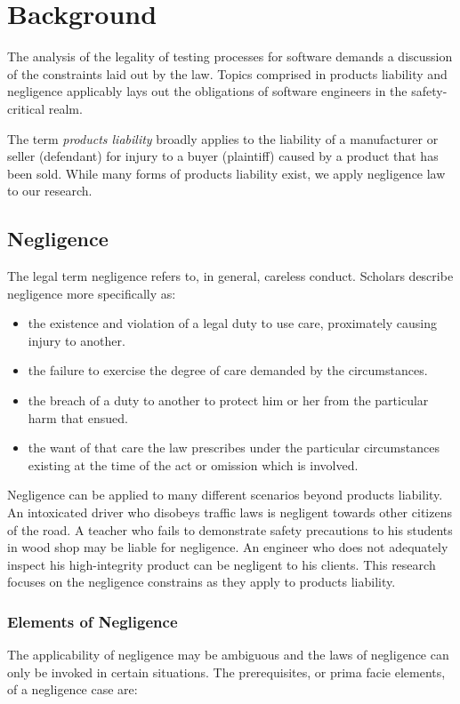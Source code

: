 \chapter{Background}
The analysis of the legality of testing processes for software demands a
discussion of the constraints laid out by the law. Topics comprised in products
liability and negligence applicably lays out the obligations of software
engineers in the safety-critical realm.

The term \textit{products liability} broadly applies to the liability of a
manufacturer or seller (defendant) for injury to a buyer (plaintiff) caused by
a product that has been sold. While many forms of products liability exist, we
apply negligence law to our research.

\section{Negligence}
The legal term negligence refers to, in general, careless conduct. Scholars
describe negligence more specifically as:

\singlespace
\begin{itemize}
 \item the existence and violation of a legal duty to use care, proximately 
 causing injury to another.
 \item the failure to exercise the degree of care demanded by the circumstances.
 \item the breach of a duty to another to protect him or her from the particular
 harm that ensued.
 \item the want of that care the law prescribes under the particular
 circumstances existing at the time of the act or omission which is involved.
\end{itemize}
\doublespace

Negligence can be applied to many different scenarios beyond products
liability. An intoxicated driver who disobeys traffic laws is negligent towards
other citizens of the road. A teacher who fails to demonstrate safety
precautions to his students in wood shop may be liable for negligence. An
engineer who does not adequately inspect his high-integrity product can be
negligent to his clients. This research focuses on the negligence constrains as
they apply to products liability.

\subsection{Elements of Negligence}
The applicability of negligence may be ambiguous and the laws of negligence can
only be invoked in certain situations. The prerequisites, or prima facie
elements, of a negligence case are:

